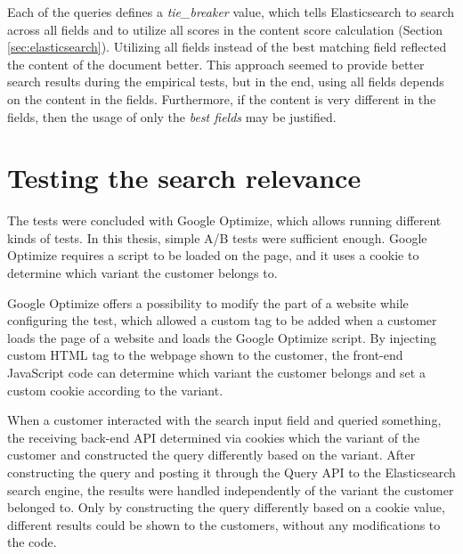 Each of the queries defines a \emph{tie\_breaker} value, which tells Elasticsearch to search across all fields and
to utilize all scores in the content score calculation (Section \ref{sec:elasticsearch}).
Utilizing all fields instead of the best matching field reflected the content of the document better.
This approach seemed to provide better search results during the empirical tests, but in the end, using all
fields depends on the content in the fields.
Furthermore, if the content is very different in the fields, then the usage of only the \emph{best fields}
may be justified.




\section{Testing the search relevance}
\label{sec:methodTests}

The tests were concluded with Google Optimize, which allows running different kinds of tests.
In this thesis, simple A/B tests were sufficient enough. 
Google Optimize requires a script to be loaded on the page, and it uses a cookie to determine 
which variant the customer belongs to.

Google Optimize offers a possibility to modify the part of a website while configuring the test, 
which allowed a custom tag to be added when a customer loads the page 
of a website and loads the Google Optimize script.
By injecting custom HTML tag to the webpage shown to the customer, the front-end JavaScript code can
determine which variant the customer belongs and set a custom cookie according to the variant.

When a customer interacted with the search input field and queried something, the receiving back-end
API determined via cookies which the variant of the customer and constructed the query differently
based on the variant.
After constructing the query and posting it through the Query API to the Elasticsearch search engine, 
the results were handled independently of the variant the customer belonged to.
Only by constructing the query differently based on a cookie value, different results could be shown 
to the customers, without any modifications to the code.


